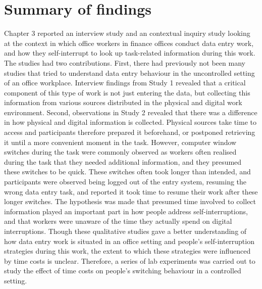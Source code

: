 \section{Summary of findings}
Chapter 3 reported an interview study and an contextual inquiry study looking at the context in which office workers in finance offices conduct data entry work, and how they self-interrupt to look up task-related information during this work. The studies had two contributions. First, there had previously not been many studies that tried to understand data entry behaviour in the uncontrolled setting of an office workplace. Interview findings from Study 1 revealed that a critical component of this type of work is not just entering the data, but collecting this information from various sources distributed in the physical and digital work environment. Second, observations in Study 2 revealed that there was a difference in how physical and digital information is collected. Physical sources take time to access and participants therefore prepared it beforehand, or postponed retrieving it until a more convenient moment in the task. However, computer window switches during the task were commonly observed as workers often realised during the task that they needed additional information, and they presumed these switches to be quick. These switches often took longer than intended, and participants were observed being logged out of the entry system, resuming the wrong data entry task, and reported it took time to resume their work after these longer switches. The hypothesis was made that presumed time involved to collect information played an important part in how people address self-interruptions, and that workers were unaware of the time they actually spend on digital interruptions. Though these qualitative studies gave a better understanding of how data entry work is situated in an office setting and people's self-interruption strategies during this work, the extent to which these strategies were influenced by time costs is unclear. Therefore, a series of lab experiments was carried out to study the effect of time costs on people's switching behaviour in a controlled setting.


